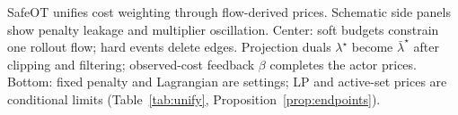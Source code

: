 SafeOT unifies cost weighting through flow-derived prices. Schematic side panels show penalty leakage and multiplier oscillation. Center: soft budgets constrain one rollout flow; hard events delete edges. Projection duals $\lambda^\star$ become $\bar\lambda^\star$ after clipping and filtering; observed-cost feedback $\beta$ completes the actor prices. Bottom: fixed penalty and Lagrangian are settings; LP and active-set prices are conditional limits (Table~\ref{tab:unify}, Proposition~\ref{prop:endpoints}).
